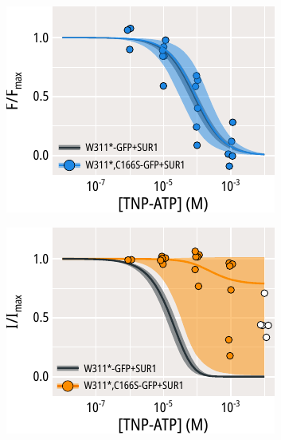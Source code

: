 \begin{figure}[hbtp]
	\centering
	\begin{subfigure}[t]{0.45\textwidth}
		\caption{}\label{ch5fig:c166s_mwc_fit_1}
		\centering
		\includegraphics[width=\textwidth]{mwc_c166s_1.pdf}
	\end{subfigure}
	\hfill
	\begin{subfigure}[t]{0.45\textwidth}
		\caption{}\label{ch5fig:c166s_mwc_fit_2}
		\centering
		\includegraphics[width=\textwidth]{mwc_c166s_3.pdf}
	\end{subfigure}
	\vfill
	\begin{subfigure}[t]{0.9\textwidth}
		\caption{}\label{ch5fig:c166s_mwc_params_1}
		\centering

\end{subfigure}
\end{figure}
